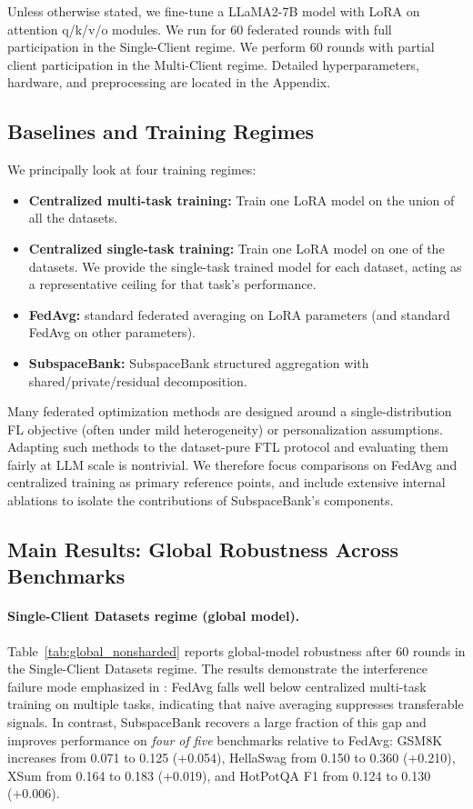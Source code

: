 \documentclass{article}
\theoremstyle{plain}
\theoremstyle{definition}
\theoremstyle{remark}
\begin{document}
Unless otherwise stated, we fine-tune a LLaMA2-7B model with LoRA on attention q/k/v/o modules. We run for 60 federated rounds with full participation in the Single-Client regime. We perform 60 rounds with partial client participation in the Multi-Client regime. Detailed hyperparameters, hardware, and preprocessing are located in the Appendix.

\subsection{Baselines and Training Regimes}
\label{sec:exp-methods}
We principally look at four training regimes:
\begin{itemize}
  \item \textbf{Centralized multi-task training:} Train one LoRA model on the union of all the datasets.
  \item \textbf{Centralized single-task training:} Train one LoRA model on one of the datasets. We provide the single-task trained model for each dataset, acting as a representative ceiling for that task's performance. 
  \item \textbf{FedAvg:} standard federated averaging on LoRA parameters (and standard FedAvg on other parameters).
  \item \textbf{SubspaceBank:} SubspaceBank structured aggregation with shared/private/residual decomposition.
\end{itemize}

Many federated optimization methods are designed around a single-distribution FL objective (often under mild heterogeneity) or personalization assumptions. Adapting such methods to the dataset-pure FTL protocol and evaluating them fairly at LLM scale is nontrivial. We therefore focus comparisons on FedAvg and centralized training as primary reference points, and include extensive internal ablations to isolate the contributions of SubspaceBank’s components.

\subsection{Main Results: Global Robustness Across Benchmarks}
\label{sec:exp-global}

\paragraph{Single-Client Datasets regime (global model).}


Table~\ref{tab:global_nonsharded} reports global-model robustness after 60 rounds in the Single-Client Datasets regime. The results demonstrate the interference failure mode emphasized in : FedAvg falls well below centralized multi-task training on multiple tasks, indicating that naive averaging suppresses transferable signals. In contrast, SubspaceBank recovers a large fraction of this gap and improves performance on \emph{four of five} benchmarks relative to FedAvg: GSM8K increases from 0.071 to 0.125 (+0.054), HellaSwag from 0.150 to 0.360 (+0.210), XSum from 0.164 to 0.183 (+0.019), and HotPotQA F1 from 0.124 to 0.130 (+0.006). 
\end{document}
